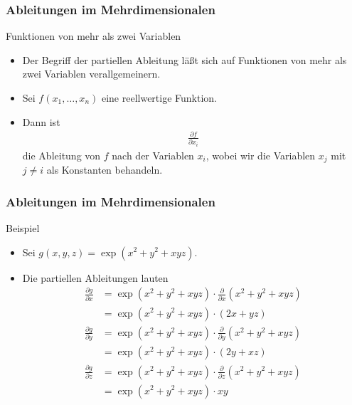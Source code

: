 \documentclass{beamer}
\newcommand\bc[1]{\left({#1}\right)}
\renewcommand{\ae}{\"a}
\newcommand{\mytitle}{Ableitungen im Mehrdimensionalen}
\begin{document}
\begin{frame}\frametitle{\mytitle}
	\begin{block}{Funktionen von mehr als zwei Variablen}
		\begin{itemize}
			\item Der Begriff der partiellen Ableitung l\ae\ss t sich auf Funktionen von mehr als zwei Variablen verallgemeinern.
			\item Sei $f(x_1,\ldots,x_n)$ eine reellwertige Funktion.
			\item Dann ist
				\begin{align*}
				\frac{\partial f}{\partial x_i}
				\end{align*}
				die Ableitung von $f$ nach der Variablen $x_i$, wobei wir die Variablen $x_j$ mit $j\neq i$ als Konstanten behandeln.
		\end{itemize}
	\end{block}
\end{frame}

\begin{frame}\frametitle{\mytitle}
	\begin{block}{Beispiel}
		\begin{itemize}
			\item Sei $g(x,y,z)=\exp(x^2+y^2+xyz)$.
			\item Die partiellen Ableitungen lauten
				\begin{align*}
					\frac{\partial g}{\partial x}&=\exp(x^2+y^2+xyz)\cdot\frac{\partial}{\partial x}(x^2+y^2+xyz)\\
												 &=\exp(x^2+y^2+xyz)\cdot\bc{2x+yz}\\
					\frac{\partial g}{\partial y}&=\exp(x^2+y^2+xyz)\cdot\frac{\partial}{\partial y}(x^2+y^2+xyz)\\
												 &=\exp(x^2+y^2+xyz)\cdot(2y+xz)\\
					\frac{\partial g}{\partial z}&=\exp(x^2+y^2+xyz)\cdot\frac{\partial}{\partial z}(x^2+y^2+xyz)\\
												 &=\exp(x^2+y^2+xyz)\cdot xy
				\end{align*}
		\end{itemize}
	\end{block}
\end{frame}
\end{document}
